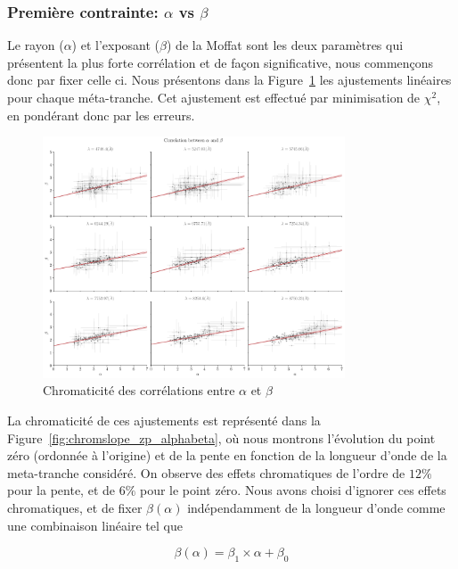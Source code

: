 \documentclass[../main/main.tex]{subfiles}
\begin{document}
\subsubsection{Première contrainte: $\alpha$ vs $\beta$}

Le rayon ($\alpha$) et l'exposant ($\beta$) de la Moffat sont les deux
paramètres qui présentent la plus forte corrélation et de façon significative, nous commençons
donc par fixer celle ci. Nous présentons dans la
Figure~\ref{fig:alphabetachromcorr} les ajustements linéaires pour
chaque méta-tranche. Cet ajustement est effectué par minimisation de
$\chi^{2}$, en pondérant donc par les erreurs.


\begin{figure}[ht]
  \centering
  \includegraphics[width=0.8\textwidth]{../figures/06_irf/STD_alpha_beta_chromatic_corr.pdf}
  \caption[Chromaticité des corrélations entre $\alpha$ et $\beta$]{Chromaticité des corrélations entre $\alpha$ et $\beta$}
  \label{fig:alphabetachromcorr}
\end{figure}

La chromaticité de ces ajustements est représenté dans la
Figure~\ref{fig:chromslope_zp_alphabeta}, où nous montrons l'évolution
du point zéro (ordonnée à l'origine) et de la pente en fonction de la
longueur d'onde de la meta-tranche considéré. On observe des effets
chromatiques de l'ordre de $12\%$ pour la pente, et de $6\%$ pour le
point zéro.
Nous avons choisi d'ignorer ces effets chromatiques, et de fixer
$\beta(\alpha)$ indépendamment de la longueur d'onde comme une
combinaison linéaire tel que

\begin{equation}
  \label{eq:betaalpha}
  \beta(\alpha) = \beta_{1}\times \alpha + \beta_{0}
\end{equation}
\end{document}
